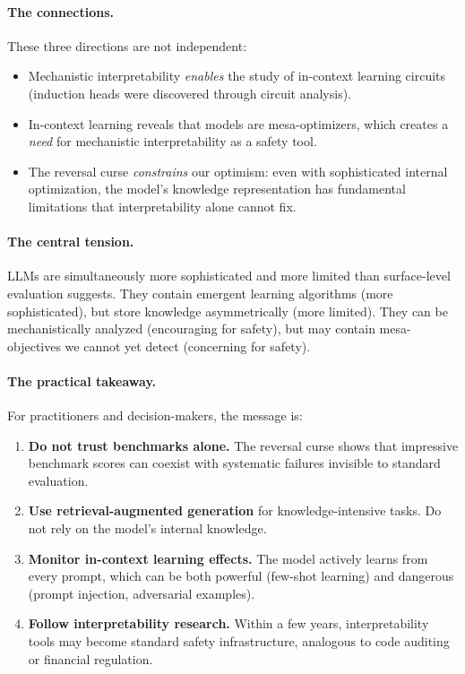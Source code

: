 \documentclass[11pt, a4paper]{article}
\theoremstyle{definition}
\theoremstyle{plain}
\begin{document}
\paragraph{The connections.}
These three directions are not independent:
\begin{itemize}[leftmargin=2em]
  \item Mechanistic interpretability \emph{enables} the study of
    in-context learning circuits (induction heads were discovered
    through circuit analysis).
  \item In-context learning reveals that models are mesa-optimizers,
    which creates a \emph{need} for mechanistic interpretability as a
    safety tool.
  \item The reversal curse \emph{constrains} our optimism: even with
    sophisticated internal optimization, the model's knowledge
    representation has fundamental limitations that interpretability
    alone cannot fix.
\end{itemize}

\paragraph{The central tension.}
LLMs are simultaneously more sophisticated and more limited than
surface-level evaluation suggests.  They contain emergent learning
algorithms (more sophisticated), but store knowledge asymmetrically
(more limited).  They can be mechanistically analyzed (encouraging for
safety), but may contain mesa-objectives we cannot yet detect
(concerning for safety).

\paragraph{The practical takeaway.}
For practitioners and decision-makers, the message is:
\begin{enumerate}[leftmargin=2em]
  \item \textbf{Do not trust benchmarks alone.}  The reversal curse
    shows that impressive benchmark scores can coexist with systematic
    failures invisible to standard evaluation.
  \item \textbf{Use retrieval-augmented generation} for knowledge-intensive
    tasks.  Do not rely on the model's internal knowledge.
  \item \textbf{Monitor in-context learning effects.}  The model actively
    learns from every prompt, which can be both powerful (few-shot
    learning) and dangerous (prompt injection, adversarial examples).
  \item \textbf{Follow interpretability research.}  Within a few years,
    interpretability tools may become standard safety infrastructure,
    analogous to code auditing or financial regulation.
\end{enumerate}
\end{document}
